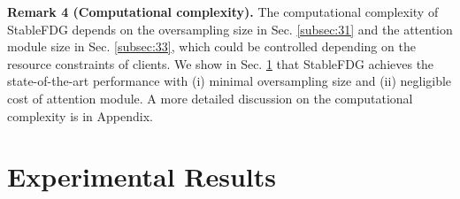 \documentclass{article}
\theoremstyle{plain}
\theoremstyle{definition}
\theoremstyle{remark}
\begin{document}
  

 
\textbf{Remark 4 (Computational complexity).} The computational complexity of StableFDG depends on the oversampling size in Sec.  \ref{subsec:31} and the attention module size in Sec. \ref{subsec:33}, %
which could be controlled depending on  the resource constraints of  clients. We show in Sec. \ref{sec:experiments} that StableFDG   achieves  the state-of-the-art performance with (i) minimal oversampling size and (ii) negligible cost of attention module. A more detailed discussion on the computational complexity is   in Appendix. %




\vspace{-1.5mm}

\section{Experimental Results}\label{sec:experiments} 

\vspace{-1.5mm}
\end{document}
